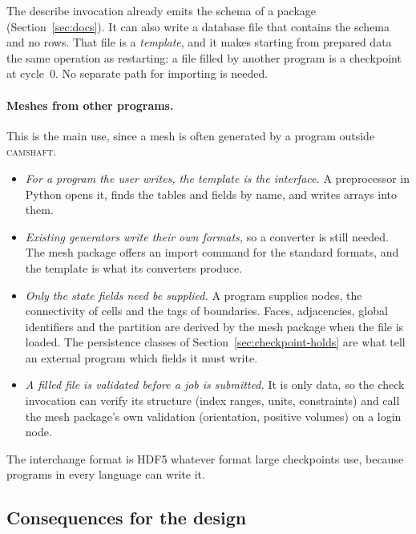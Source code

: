 \documentclass[11pt,a4paper]{article}
\newcommand{\camshaft}{\textsc{camshaft}}
\begin{document}
The describe invocation already emits the schema of a package
(Section~\ref{sec:docs}).  It can also write a database file that contains
the schema and no rows.  That file is a \emph{template}, and it makes
starting from prepared data the same operation as restarting: a file filled
by another program is a checkpoint at cycle~0.  No separate path for
importing is needed.

\paragraph{Meshes from other programs.}  This is the main use, since a mesh
is often generated by a program outside \camshaft{}.

\begin{itemize}
  \item \emph{For a program the user writes, the template is the
        interface.}  A preprocessor in Python opens it, finds the tables
        and fields by name, and writes arrays into them.
  \item \emph{Existing generators write their own formats,} so a converter
        is still needed.  The mesh package offers an import command for the
        standard formats, and the template is what its converters produce.
  \item \emph{Only the state fields need be supplied.}  A program supplies
        nodes, the connectivity of cells and the tags of boundaries.  Faces,
        adjacencies, global identifiers and the partition are derived by
        the mesh package when the file is loaded.  The persistence classes
        of Section~\ref{sec:checkpoint-holds} are what tell an external
        program which fields it must write.
  \item \emph{A filled file is validated before a job is submitted.}  It is
        only data, so the check invocation can verify its structure (index
        ranges, units, constraints) and call the mesh package's own
        validation (orientation, positive volumes) on a login node.
\end{itemize}

The interchange format is HDF5 whatever format large checkpoints use,
because programs in every language can write it.

\subsection{Consequences for the design}
\end{document}
